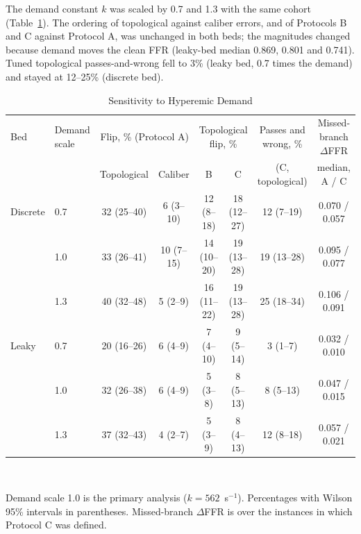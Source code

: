 The demand constant $k$ was scaled by 0.7 and 1.3 with the same cohort (Table~\ref{tab:demand}). The ordering of
topological against caliber errors, and of Protocols B and C against Protocol A, was unchanged in both beds; the
magnitudes changed because demand moves the clean FFR (leaky-bed median 0.869, 0.801 and 0.741). Tuned topological
passes-and-wrong fell to 3\% (leaky bed, 0.7 times the demand) and stayed at 12--25\% (discrete bed).
\begin{table}[!h]
\caption{Sensitivity to Hyperemic Demand}\label{tab:demand}
\centering\small
\begin{tabular}{@{}llcccccc@{}}
\toprule
Bed & Demand scale & \multicolumn{2}{c}{Flip, \% (Protocol A)} & \multicolumn{2}{c}{Topological flip, \%} &
Passes and wrong, \% & Missed-branch $\Delta$FFR\\
\cmidrule(lr){3-4}\cmidrule(lr){5-6}
 & & Topological & Caliber & B & C & (C, topological) & median, A / C\\
\midrule
Discrete & 0.7 & 32 (25--40) & 6 (3--10) & 12 (8--18) & 18 (12--27) & 12 (7--19) & 0.070 / 0.057 \\
 & 1.0 & 33 (26--41) & 10 (7--15) & 14 (10--20) & 19 (13--28) & 19 (13--28) & 0.095 / 0.077 \\
 & 1.3 & 40 (32--48) & 5 (2--9) & 16 (11--22) & 19 (13--28) & 25 (18--34) & 0.106 / 0.091 \\
Leaky & 0.7 & 20 (16--26) & 6 (4--9) & 7 (4--10) & 9 (5--14) & 3 (1--7) & 0.032 / 0.010 \\
 & 1.0 & 32 (26--38) & 6 (4--9) & 5 (3--8) & 8 (5--13) & 8 (5--13) & 0.047 / 0.015 \\
 & 1.3 & 37 (32--43) & 4 (2--7) & 5 (3--9) & 8 (4--13) & 12 (8--18) & 0.057 / 0.021 \\
\bottomrule
\end{tabular}
\\[3pt]
\parbox{0.9\textwidth}{\footnotesize Demand scale 1.0 is the primary analysis ($k = 562$~s$^{-1}$). Percentages with Wilson 95\%
intervals in parentheses. Missed-branch $\Delta$FFR is over the instances in which Protocol C was defined.}
\end{table}
